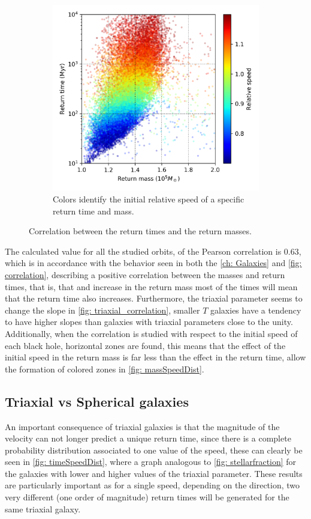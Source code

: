 \begin{figure}[h]
\begin{subfigure}[b]{0.49\textwidth}
			\includegraphics[width = \textwidth]{"../Files/Week 13/correlation_speed"}
			\caption{Colors identify the initial relative speed of a specific return time and mass.}
		\end{subfigure}
		\caption{Correlation between the return times and the return masses.}
		\label{fig: speed_correlation}
	\end{figure}
	
	The calculated value for all the studied orbits, of the Pearson correlation is 0.63, which is in accordance with the behavior seen in both the \autoref{ch: Galaxies} and \autoref{fig: correlation}, describing a positive correlation between the masses and return times, that is, that and increase in the return mass most of the times will mean that the return time also increases. Furthermore, the triaxial parameter seems to change the slope in \autoref{fig: triaxial_correlation}, smaller $T$ galaxies have a tendency to have higher slopes than galaxies with triaxial parameters close to the unity. Additionally, when the correlation is studied with respect to the initial speed of each black hole, horizontal zones are found, this means that the effect of the initial speed in the return mass is far less than the effect in the return time, allow the formation of colored zones in \autoref{fig: massSpeedDist}. 
	
	\subsection{Triaxial vs Spherical galaxies}
	An important consequence of triaxial galaxies is that the magnitude of the velocity can not longer predict a unique return time, since there is a complete probability distribution associated to one value of the speed, these can clearly be seen in \autoref{fig: timeSpeedDist}, where a graph analogous to \autoref{fig: stellarfraction} for the galaxies with lower and higher values of the triaxial parameter. These results are particularly important as for a single speed, depending on the direction, two very different (one order of magnitude) return times will be generated for the same triaxial galaxy.
	

